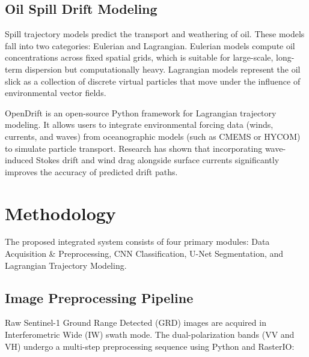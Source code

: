 \documentclass[conference]{IEEEtran}
\begin{document}
\subsection{Oil Spill Drift Modeling}
Spill trajectory models predict the transport and weathering of oil. These models fall into two categories: Eulerian and Lagrangian. Eulerian models compute oil concentrations across fixed spatial grids, which is suitable for large-scale, long-term dispersion but computationally heavy. Lagrangian models represent the oil slick as a collection of discrete virtual particles that move under the influence of environmental vector fields. 

OpenDrift is an open-source Python framework for Lagrangian trajectory modeling. It allows users to integrate environmental forcing data (winds, currents, and waves) from oceanographic models (such as CMEMS or HYCOM) to simulate particle transport. Research has shown that incorporating wave-induced Stokes drift and wind drag alongside surface currents significantly improves the accuracy of predicted drift paths.

\section{Methodology}
The proposed integrated system consists of four primary modules: Data Acquisition \& Preprocessing, CNN Classification, U-Net Segmentation, and Lagrangian Trajectory Modeling. 

\subsection{Image Preprocessing Pipeline}
Raw Sentinel-1 Ground Range Detected (GRD) images are acquired in Interferometric Wide (IW) swath mode. The dual-polarization bands (VV and VH) undergo a multi-step preprocessing sequence using Python and RasterIO:
\end{document}
